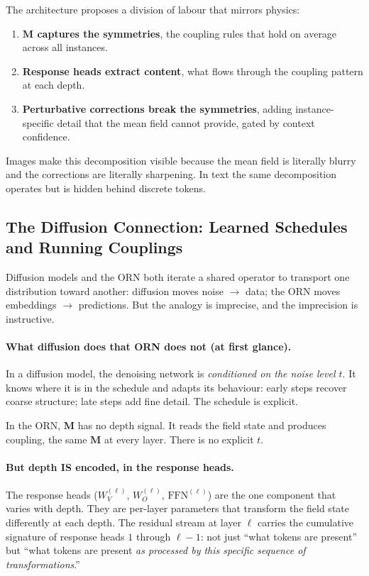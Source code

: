 \documentclass[11pt, a4paper]{article}
\newcommand{\M}{\mathbf{M}}
\theoremstyle{plain}
\theoremstyle{remark}
\begin{document}
The architecture proposes a division of labour that mirrors physics:
\begin{enumerate}[nosep]
    \item \textbf{$\M$ captures the symmetries}, the coupling rules that hold on average across all instances.
    \item \textbf{Response heads extract content}, what flows through the coupling pattern at each depth.
    \item \textbf{Perturbative corrections break the symmetries}, adding instance-specific detail that the mean field cannot provide, gated by context confidence.
\end{enumerate}

Images make this decomposition visible because the mean field is literally blurry and the corrections are literally sharpening.
In text the same decomposition operates but is hidden behind discrete tokens.

\subsection{The Diffusion Connection: Learned Schedules and Running Couplings}

Diffusion models and the ORN both iterate a shared operator to transport one distribution toward another: diffusion moves noise $\to$ data; the ORN moves embeddings $\to$ predictions.
But the analogy is imprecise, and the imprecision is instructive.

\paragraph{What diffusion does that ORN does not (at first glance).}
In a diffusion model, the denoising network is \emph{conditioned on the noise level $t$}.
It knows where it is in the schedule and adapts its behaviour: early steps recover coarse structure; late steps add fine detail.
The schedule is explicit.

In the ORN, $\M$ has no depth signal.
It reads the field state and produces coupling, the same $\M$ at every layer.
There is no explicit $t$.

\paragraph{But depth IS encoded, in the response heads.}
The response heads ($W_V^{(\ell)}$, $W_O^{(\ell)}$, $\text{FFN}^{(\ell)}$) are the one component that varies with depth.
They are per-layer parameters that transform the field state differently at each depth.
The residual stream at layer $\ell$ carries the cumulative signature of response heads $1$ through $\ell{-}1$: not just ``what tokens are present'' but ``what tokens are present \emph{as processed by this specific sequence of transformations}.''
\end{document}
